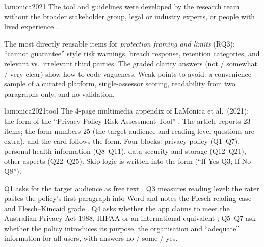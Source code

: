 \begin{papercard}{lamonica2021}
 The tool and guidelines were developed by the research team without the broader stakeholder group, legal or industry experts, or people with lived experience .

 The most directly reusable items for \emph{protection framing and limits} (RQ3): ``cannot guarantee'' style risk warnings, breach response, retention categories, and relevant vs.\ irrelevant third parties. The graded clarity answers (not / somewhat / very clear) show how to code vagueness. Weak points to avoid: a convenience sample of a curated platform, single-assessor scoring, readability from two paragraphs only, and no validation.
\end{papercard}


\begin{papercard}{lamonica2021tool}
 The 4-page multimedia appendix of LaMonica et al.\ (2021): the form of the ``Privacy Policy Risk Assessment Tool'' . The article reports 23 items; the form numbers 25 (the target audience and reading-level questions are extra), and the card follows the form. Four blocks: privacy policy (Q1--Q7), personal health information (Q8--Q11), data security and storage (Q12--Q21), other aspects (Q22--Q25). Skip logic is written into the form (``If Yes Q3; If No Q8'').

 Q1 asks for the target audience as free text . Q3 measures reading level: the rater pastes the policy's first paragraph into Word and notes the Flesch reading ease and Flesch--Kincaid grade . Q4 asks whether the app claims to meet the Australian Privacy Act 1988, HIPAA or an international equivalent ; Q5--Q7 ask whether the policy introduces its purpose, the organisation and ``adequate'' information for all users, with answers no / some / yes.


\end{papercard}
